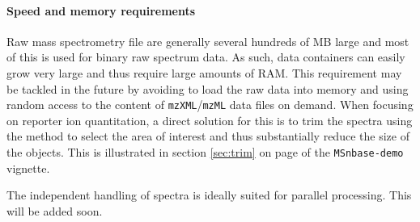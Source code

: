 \paragraph{Speed and memory requirements} Raw mass spectrometry file are generally several 
hundreds of MB large and most of this is used for binary raw spectrum data. As such, 
data containers can easily grow very large and thus require large amounts of RAM. 
This requirement may be tackled in the future by avoiding to load the raw data into memory
and using random access to the content of \texttt{mzXML}/\texttt{mzML} data files on demand. 
When focusing on reporter ion quantitation, a direct solution for this is to trim the 
spectra using the  method to select the area of interest and thus 
substantially reduce the size of the  objects. This is illustrated in 
section \ref{sec:trim} on page \pageref{trimMz-example} of the \texttt{MSnbase-demo} vignette.

The independent handling of spectra is ideally suited for parallel processing. 
This will be added soon.



